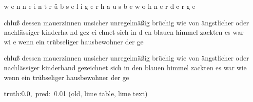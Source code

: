 \documentclass[a4paper,10pt,twoside]{article}
\begin{document}
{\color[rgb]{0.0,0,0} w}{\color[rgb]{0.0,0,0} e}{\color[rgb]{0.0,0,0} n}{\color[rgb]{0.0,0,0} n} {\color[rgb]{0.0,0,0} e}{\color[rgb]{0.0,0,0} i}{\color[rgb]{0.0,0,0} n} {\color[rgb]{0.0,0,0} t}{\color[rgb]{0.0,0,0} r}{\color[rgb]{0.0,0,0} ü}{\color[rgb]{0.0,0,0} b}{\color[rgb]{0.0,0,0} s}{\color[rgb]{0.001,0,0} e}{\color[rgb]{0.001,0,0} l}{\color[rgb]{0.001,0,0} i}{\color[rgb]{0.0,0,0} g}{\color[rgb]{0.0,0,0} e}{\color[rgb]{0.0,0,0} r} {\color[rgb]{0.0,0,0} h}{\color[rgb]{0.0,0,0} a}{\color[rgb]{0.0,0,0} u}{\color[rgb]{0.0,0,0} s}{\color[rgb]{0.0,0,0} b}{\color[rgb]{0.001,0,0} e}{\color[rgb]{0.0,0,0} w}{\color[rgb]{0.0,0,0} o}{\color[rgb]{0.001,0,0} h}{\color[rgb]{0.001,0,0} n}{\color[rgb]{0.0,0,0} e}{\color[rgb]{0.001,0,0} r} {\color[rgb]{0.001,0,0} d}{\color[rgb]{0.002,0,0} e}{\color[rgb]{0.002,0,0} r} {\color[rgb]{0.0,0,0} g}{\color[rgb]{0.0,0,0} e}

chluß dessen mauerzinnen unsicher unregelmäßig brüchig wie von ängstlicher oder nachlässiger kinderha{\color[rgb]{1,0,0} n}d gez{\color[rgb]{0,0,1} e}i{\color[rgb]{0,0,1} c}hnet sich in d{\color[rgb]{0,0,1} e}n blauen himmel zackten es war wi{\color[rgb]{1,0,0} e} wenn ein trübseliger hausbewohner der ge

 {\color[rgb]{0,0,0.571} chluß} dessen mauerzinnen unsicher unregelmäßig brüchig wie von {\color[rgb]{0,0,0.348} ängstlicher} oder nachlässiger {\color[rgb]{0.328,0,0} kinderhand} {\color[rgb]{0.775,0,0} gezeichnet} {\color[rgb]{0.792,0,0} sich} in den blauen himmel zackten es war wie wenn ein trübseliger hausbewohner der ge

 {\footnotesize {\color[rgb]{0.6, 0.6, 0.6}truth:0.0,~pred:~0.01}} (old, lime table, lime text)\hrulefill
\end{document}
